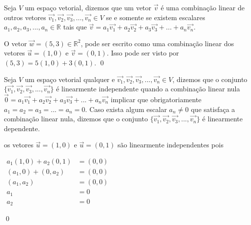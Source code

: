 \begin{definition}
    Seja $V$ um espaço vetorial, dizemos que um vetor $\vec{v}$ é uma combinação linear de outros vetores $\vec{v_1}, \vec{v_2}, \vec{v_3},...,\vec{v_n} \in V$ se e somente se existem escalares $a_1, a_2, a_3,...,a_n \in \mathbb{R}$ tais que $\vec{v}=a_1 \vec{v_1}+a_2 \vec{v_2}+ a_3 \vec{v_3}+...+a_n \vec{v_n}$.
\end{definition}

    \begin{exemplo}
        O vetor $\vec{w} = (5,3) \in \mathbb{R}^{2}$, pode ser escrito como uma combinação linear dos vetores $\vec{u} = (1,0)$ e $\vec{v} = (0,1)$. Isso pode ser visto por $(5,3) = 5(1,0) + 3(0,1)$.
    \qed
    \end{exemplo}

\begin{definition}
    Seja $V$ um espaço vetorial qualquer e $\vec{v_1}, \vec{v_2}, \vec{v_3},...,\vec{v_n} \in V$, dizemos que o conjunto $\{ \vec{v_1}, \vec{v_2}, \vec{v_3},...,\vec{v_n} \}$ é linearmente independente quando a combinação linear nula $\vec{0}=a_1 \vec{v_1}+a_2 \vec{v_2}+ a_3 \vec{v_3}+...+a_n \vec{v_n}$ implicar que obrigatoriamente $a_1=a_2=a_3=...=a_n= 0$. Caso exista algum escalar $a_n \neq 0$ que satisfaça a combinação linear nula, dizemos que o conjunto $\{ \vec{v_1}, \vec{v_2}, \vec{v_3},...,\vec{v_n} \}$ é linearmente dependente.
\end{definition}

    \begin{exemplo}
        os vetores $\vec{u} = (1,0)$ e $\vec{u} = (0,1)$ são linearmente independentes pois\\

        \begin{center}
            $\begin{array}{rl}
                a_1 (1,0) + a_2 (0,1) &= (0,0)\\
                (a_1,0) + (0,a_2) &= (0,0)\\
                (a_1,a_2) &= (0,0)\\
                a_1 &= 0\\ 
                a_2 &= 0
            \end{array}$
        \end{center}

    \qed
    \end{exemplo}
    
